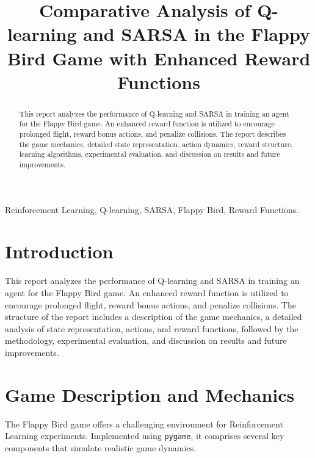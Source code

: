 \documentclass[conference]{IEEEtran}
\begin{document}
\title{Comparative Analysis of Q-learning and SARSA in the Flappy Bird Game with Enhanced Reward Functions}

\author{
}

\maketitle

\begin{abstract}
This report analyzes the performance of Q-learning and SARSA in training an agent for the Flappy Bird game. An enhanced reward function is utilized to encourage prolonged flight, reward bonus actions, and penalize collisions. The report describes the game mechanics, detailed state representation, action dynamics, reward structure, learning algorithms, experimental evaluation, and discussion on results and future improvements.
\end{abstract}

\begin{IEEEkeywords}
Reinforcement Learning, Q-learning, SARSA, Flappy Bird, Reward Functions.
\end{IEEEkeywords}

\section{Introduction}
This report analyzes the performance of Q-learning and SARSA in training an agent for the Flappy Bird game. An enhanced reward function is utilized to encourage prolonged flight, reward bonus actions, and penalize collisions. The structure of the report includes a description of the game mechanics, a detailed analysis of state representation, actions, and reward functions, followed by the methodology, experimental evaluation, and discussion on results and future improvements.

\section{Game Description and Mechanics}
The Flappy Bird game offers a challenging environment for Reinforcement Learning experiments. Implemented using \texttt{pygame}, it comprises several key components that simulate realistic game dynamics.
\end{document}
